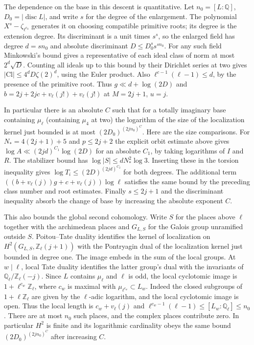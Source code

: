 \documentclass[11pt]{amsart}
\theoremstyle{definition}
\theoremstyle{remark}
\begin{document}
The dependence on the base in this descent is quantitative.
Let $n_0=[L:\mathbb Q]$, $D_0=|\operatorname{disc}L|$, and write
$s$ for the degree of the enlargement. The polynomial
$X^s-\zeta_{\ell^{c_0}}$ generates it on choosing compatible primitive
roots; its degree is the extension degree. Its discriminant is a
unit times $s^s$, so the enlarged field has degree $d=sn_0$ and
absolute discriminant $D\le D_0^s s^{sn_0}$. For any such field
Minkowski's bound gives a representative of each ideal class of norm
at most $2^d\sqrt D$. Counting all ideals up to this bound by their
Dirichlet series at two gives
$|\mathrm{Cl}|\le4^dD\zeta(2)^d$, using the Euler product.
Also $\ell^{c-1}(\ell-1)\le d$, by the presence of the primitive
root. Thus $g\ll d+\log(2D)$ and
$b=2j+2jc+v_\ell(j!)+v_\ell(j!)$ at $M=2j+1$, $u=j$.

In particular there is an absolute $C$ such that for a totally imaginary base containing $\mu_\ell$ (containing $\mu_4$ at two) the
logarithm of the size of the localization kernel just bounded is at
most $(2D_0)^{(2jn_0)^C}$. Here are the size comparisons. For
$N_*=4(2j+1)+5$ and $p\le2j+2$ the explicit orbit estimate above
gives $\log A\ll (2jd)^{C_1}\log(2D)$ for an absolute $C_1$,
by taking logarithms of $I$ and $R$. The stabilizer bound has
$\log |S|\le dN_*^2\log3$. Inserting these in the torsion
inequality gives $\log T_i\le (2D)^{(2jd)^{C_2}}$ for both degrees.
The additional term $((b+v_\ell(j))g+c+v_\ell(j))\log\ell$
satisfies the same bound by the preceding class number and root
estimates. Finally $s\le2j+1$ and the discriminant inequality
absorb the change of base by increasing the absolute exponent $C$.

This also bounds the global second cohomology. Write $S$ for the
places above $\ell$ together with the archimedean places and
$G_{L,S}$ for the Galois group unramified outside $S$.
Poitou--Tate duality identifies the kernel of localization on
$H^2(G_{L,S},\mathbb Z_\ell(j+1))$ with the Pontryagin dual of the
localization kernel just bounded in degree one. The image embeds in
the sum of the local groups. At $w\mid\ell$, local Tate duality identifies
the latter group's dual with the invariants of
$\mathbb Q_\ell/\mathbb Z_\ell(-j)$. Since $L$ contains $\mu_\ell$
and $\ell$ is odd, the local cyclotomic image is $1+\ell^{c_w}\mathbb Z_\ell$,
where $c_w$ is maximal with $\mu_{\ell^{c_w}}\subset L_w$.
Indeed the closed subgroups of $1+\ell\mathbb Z_\ell$ are given by
the $\ell$-adic logarithm, and the local cyclotomic image is open.
Thus the local length is $c_w+v_\ell(j)$ and
$\ell^{c_w-1}(\ell-1)\le[L_w:\mathbb Q_\ell]\le n_0$.
There are at most $n_0$ such places, and the complex places contribute
zero. In particular $H^2$ is finite and its logarithmic cardinality
obeys the same bound $(2D_0)^{(2jn_0)^C}$ after increasing $C$.
\end{document}

